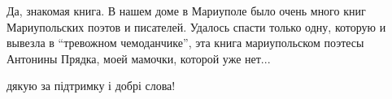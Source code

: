  
 
 
 
 

\qqSecCmt


Да, знакомая книга. В нашем доме в Мариуполе было очень много книг
Мариупольских поэтов и писателей. Удалось спасти только одну, которую и вывезла
в \enquote{тревожном чемоданчике}, эта книга мариупольском поэтесы Антонины Прядка,
моей мамочки, которой уже нет...


дякую за підтримку і добрі слова!
